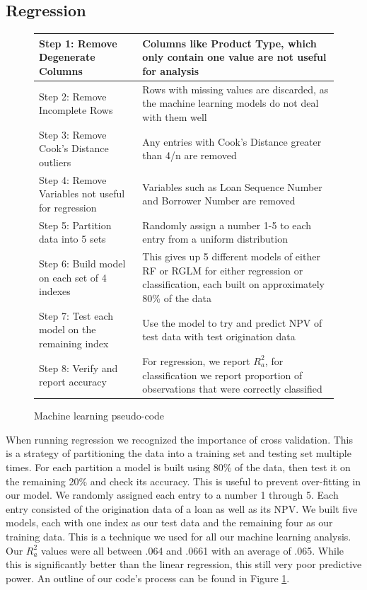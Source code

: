 \documentclass[12 pt]{uncw_thesis}
\theoremstyle{plain}
\theoremstyle{remark}
\theoremstyle{definition}
\begin{document}
\subsection{Regression}
\begin{figure}
\begin{center}
	\begin{tabular}{|M{5.5cm}|M{8.75cm}|}
		\hline
		Step 1: Remove Degenerate Columns & Columns like Product Type, which only contain one value are not useful for analysis\\
		\hline
		Step 2: Remove Incomplete Rows & Rows with missing values are discarded, as the machine learning models do not deal with them well\\
		\hline
		Step 3: Remove Cook's Distance outliers & Any entries with Cook's Distance greater than 4/n are removed\\
		\hline
		Step 4: Remove Variables not useful for regression & Variables such as Loan Sequence Number and Borrower Number are removed\\
		\hline
		Step 5: Partition data into 5 sets & Randomly assign a number 1-5 to each entry from a uniform distribution\\
		\hline
		Step 6: Build model on each set of 4 indexes & This gives up 5 different models of either RF or RGLM for either regression or classification, each built on approximately 80\% of the data\\
		\hline
		Step 7: Test each model on the remaining index & Use the model to try and predict NPV of test data with test origination data\\
		\hline
		Step 8: Verify and report accuracy & For regression, we report \(R_a^2\), for classification we report proportion of observations that were correctly classified\\ 
		\hline
	\end{tabular}
\end{center}
\caption{Machine learning pseudo-code} \label{fig:MLCode}
\end{figure}
When running regression we recognized the importance of cross validation. This is a strategy of partitioning the data into a training set and testing set multiple times. For each partition a model is built using 80\% of the data, then test it on the remaining 20\% and check its accuracy. This is useful to prevent over-fitting in our model. We randomly assigned each entry to a number 1 through 5. Each entry consisted of the origination data of a loan as well as its NPV. We built five models, each with one index as our test data and the remaining four as our training data. This is a technique we used for all our machine learning analysis. Our \(R_a^2\) values were all between .064 and .0661 with an average of .065. While this is significantly better than the linear regression, this still very poor predictive power. An outline of our code's process can be found in Figure \ref{fig:MLCode}.
\end{document}

